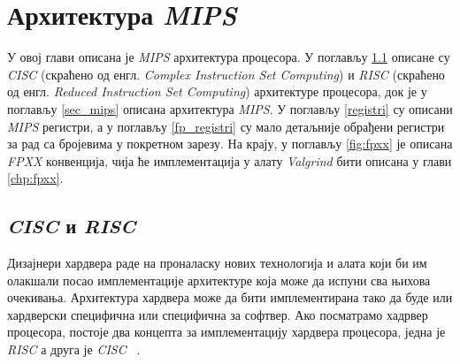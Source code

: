 \documentclass[12pt,oneside]{memoir}
\begin{document}



\chapter{Архитектура \textit{MIPS}}
\label{chp:mips}

\indent У овој глави описана је \textit{MIPS} архитектура процесора. У поглављу \ref{cisc_risc} описане су \textit{CISC} (скраћено од енгл. \textit{Complex Instruction Set Computing}) и \textit{RISC} (скраћено од енгл. \textit{Reduced Instruction Set Computing}) архитектуре процесора, док је у поглављу \ref{sec_mips} описана архитектура \textit{MIPS}. У поглављу  \ref{registri} су описани \textit{MIPS} регистри, а у поглављу \ref{fp_registri} су мало детаљније обрађени регистри за рад са бројевима у покретном зарезу. На крају, у поглављу \ref{fig:fpxx} је описана \textit{FPXX} конвенција, чија ће имплементација у алату \textit{Valgrind} бити описана у глави \ref{chp:fpxx}.

\section{\textit{CISC} и \textit{RISC}}
\label{cisc_risc}

\indent Дизајнери хардвера раде на проналаску нових технологија и алата који би им олакшали посао имплементације архитектуре која може да испуни сва њихова очекивања. Архитектура хардвера може да бити имплементирана тако да буде или хардверски специфична или специфична за софтвер. Ако посматрамо хадрвер процесора, постоје два концепта за имплементацију хардвера процесора, једна је \textit{RISC} а друга је \textit{CISC} ~\cite{rcRef}.
\end{document}
